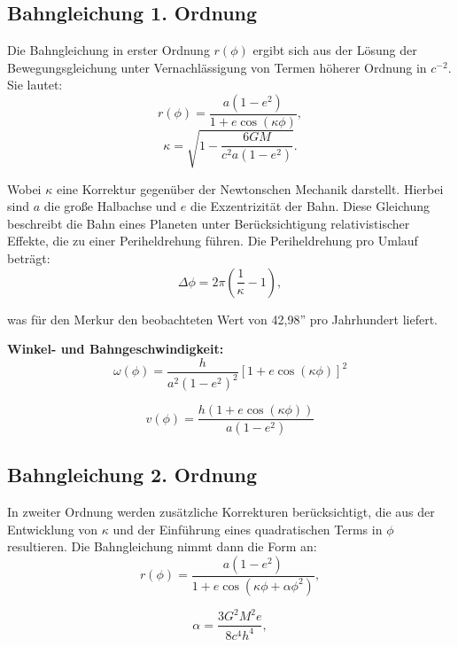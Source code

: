 \subsection{Bahngleichung 1. Ordnung}
Die Bahngleichung in erster Ordnung $r(\phi)$ ergibt sich aus der Lösung der Bewegungsgleichung unter Vernachlässigung von Termen höherer Ordnung in $c^{-2}$. Sie lautet:
\begin{equation}
r(\phi) = \frac{a(1 - e^2)}{1 + e \cos(\kappa \phi)},    
\end{equation}
\begin{equation}
\kappa = \sqrt{1 - \frac{6GM}{c^2 a(1 - e^2)}}.
\end{equation}

Wobei $\kappa$ eine Korrektur gegenüber der Newtonschen Mechanik darstellt. Hierbei sind $a$ die große Halbachse und $e$ die Exzentrizität der Bahn.
Diese Gleichung beschreibt die Bahn eines Planeten unter Berücksichtigung relativistischer Effekte, die zu einer Periheldrehung führen.
Die Periheldrehung pro Umlauf beträgt:
\begin{equation}
\Delta \phi = 2\pi \left(\frac{1}{\kappa} - 1\right),
\end{equation}

was für den Merkur den beobachteten Wert von 42,98'' pro Jahrhundert liefert.

\textbf{Winkel- und Bahngeschwindigkeit:}
\begin{equation}
\omega(\phi) = \frac{h}{a^2(1 - e^2)^2} \left[1 + e \cos(\kappa \phi)\right]^2    
\end{equation}

\begin{equation}    
v(\phi) = \frac{h \left(1 + e \cos(\kappa \phi)\right)}{a(1 - e^2)}
\end{equation}

\subsection{Bahngleichung 2. Ordnung}
In zweiter Ordnung werden zusätzliche Korrekturen berücksichtigt, die aus der Entwicklung von $\kappa$ und der Einführung eines quadratischen Terms in $\phi$ resultieren.
Die Bahngleichung nimmt dann die Form an:
\begin{equation}
\label{eq:weber_r_2_ordnung}
r(\phi) = \frac{a(1 - e^2)}{1 + e \cos(\kappa \phi + \alpha \phi^2)},
\end{equation}

\begin{equation}
\alpha = \frac{3G^2 M^2 e}{8c^4 h^4},
\end{equation}

